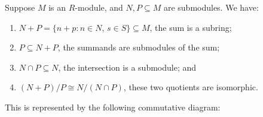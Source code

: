 \begin{theorem}\label{thm:iso-2-mod}
    Suppose \(M\) is an \(R\)-module,
    and \(N,P \subseteq M\) are submodules.
    We have:
    \begin{enumerate}[label={(\alph*)}, itemsep=0mm]
        \item \(N+P = \{n+p: n \in N,\, s \in S\} \subseteq M\), the sum is a subring;
        \item \(P \subseteq N+P\), the summands are submodules of the sum;
        \item \(N \cap P \subseteq N\), the intersection is a submodule; and
        \item \((N+P)/P \cong N/(N \cap P)\), these two quotients are isomorphic.
    \end{enumerate}

    This is represented by the following commutative diagram:
    \begin{center}
    \end{center}
\end{theorem}
